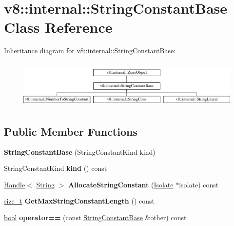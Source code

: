 \hypertarget{classv8_1_1internal_1_1StringConstantBase}{}\section{v8\+:\+:internal\+:\+:String\+Constant\+Base Class Reference}
\label{classv8_1_1internal_1_1StringConstantBase}
Inheritance diagram for v8\+:\+:internal\+:\+:String\+Constant\+Base\+:\begin{figure}[H]
\begin{center}
\leavevmode
\includegraphics[height=2.456140cm]{classv8_1_1internal_1_1StringConstantBase}
\end{center}
\end{figure}
\subsection*{Public Member Functions}
\begin{DoxyCompactItemize}
\item 
\mbox{\label{classv8_1_1internal_1_1StringConstantBase_abbd72124dac1637a66bae3b6588b2d40}} 
{\bfseries String\+Constant\+Base} (String\+Constant\+Kind kind)
\item 
\mbox{\label{classv8_1_1internal_1_1StringConstantBase_abe4defd383ef9aef1a5e190f1db0042c}} 
String\+Constant\+Kind {\bfseries kind} () const
\item 
\mbox{\label{classv8_1_1internal_1_1StringConstantBase_ab1ad76b26079544b7f97b8a34cf07aad}} 
\mbox{\hyperlink{classv8_1_1internal_1_1Handle}{Handle}}$<$ \mbox{\hyperlink{classv8_1_1internal_1_1String}{String}} $>$ {\bfseries Allocate\+String\+Constant} (\mbox{\hyperlink{classv8_1_1internal_1_1Isolate}{Isolate}} $\ast$isolate) const
\item 
\mbox{\label{classv8_1_1internal_1_1StringConstantBase_af59d4bd722a23eb7ff9758c11937c703}} 
\mbox{\hyperlink{classsize__t}{size\+\_\+t}} {\bfseries Get\+Max\+String\+Constant\+Length} () const
\item 
\mbox{\label{classv8_1_1internal_1_1StringConstantBase_af1032ec7a59fa0c66e998eab4ff7b107}} 
\mbox{\hyperlink{classbool}{bool}} {\bfseries operator==} (const \mbox{\hyperlink{classv8_1_1internal_1_1StringConstantBase}{String\+Constant\+Base}} \&other) const
\end{DoxyCompactItemize}



